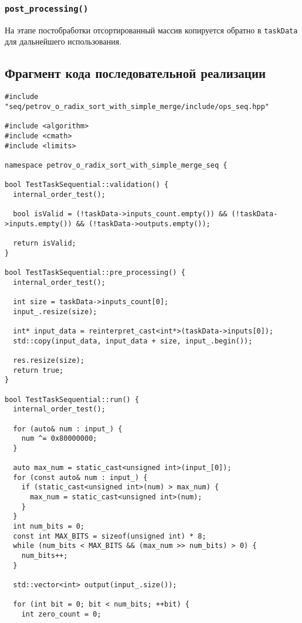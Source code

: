 \documentclass[12pt]{article}
\begin{document}
\subsubsection{\texttt{post\_processing()}}
На этапе постобработки отсортированный массив копируется обратно в \texttt{taskData} для дальнейшего использования.

\subsection{Фрагмент кода последовательной реализации}

\begin{lstlisting}[caption={Последовательная версия поразрядной сортировки}]
#include "seq/petrov_o_radix_sort_with_simple_merge/include/ops_seq.hpp"

#include <algorithm>
#include <cmath>
#include <limits>

namespace petrov_o_radix_sort_with_simple_merge_seq {

bool TestTaskSequential::validation() {
  internal_order_test();

  bool isValid = (!taskData->inputs_count.empty()) && (!taskData->inputs.empty()) && (!taskData->outputs.empty());

  return isValid;
}

bool TestTaskSequential::pre_processing() {
  internal_order_test();

  int size = taskData->inputs_count[0];
  input_.resize(size);

  int* input_data = reinterpret_cast<int*>(taskData->inputs[0]);
  std::copy(input_data, input_data + size, input_.begin());

  res.resize(size);
  return true;
}

bool TestTaskSequential::run() {
  internal_order_test();

  for (auto& num : input_) {
    num ^= 0x80000000;
  }

  auto max_num = static_cast<unsigned int>(input_[0]);
  for (const auto& num : input_) {
    if (static_cast<unsigned int>(num) > max_num) {
      max_num = static_cast<unsigned int>(num);
    }
  }
  int num_bits = 0;
  const int MAX_BITS = sizeof(unsigned int) * 8;
  while (num_bits < MAX_BITS && (max_num >> num_bits) > 0) {
    num_bits++;
  }

  std::vector<int> output(input_.size());

  for (int bit = 0; bit < num_bits; ++bit) {
    int zero_count = 0;


\end{lstlisting}
\end{document}
